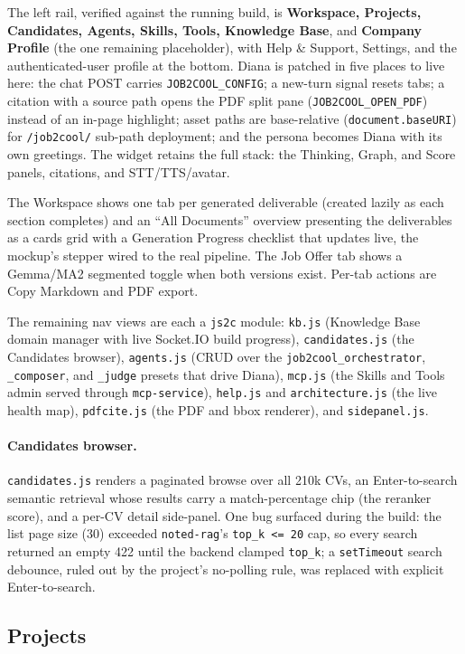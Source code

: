 The left rail, verified against the running build, is \textbf{Workspace, Projects,
Candidates, Agents, Skills, Tools, Knowledge Base}, and \textbf{Company Profile} (the one
remaining placeholder), with Help \& Support, Settings, and the authenticated-user profile
at the bottom. Diana is patched in five places to live here: the chat POST carries
\verb|JOB2COOL_CONFIG|; a new-turn signal resets tabs; a citation with a source path opens
the PDF split pane (\verb|JOB2COOL_OPEN_PDF|) instead of an in-page highlight; asset paths
are base-relative (\verb|document.baseURI|) for \verb|/job2cool/| sub-path deployment; and
the persona becomes Diana with its own greetings. The widget retains the full stack: the
Thinking, Graph, and Score panels, citations, and STT/TTS/avatar.

The Workspace shows one tab per generated deliverable (created lazily as each section
completes) and an ``All Documents'' overview presenting the deliverables as a cards grid
with a Generation Progress checklist that updates live, the mockup's stepper wired to the
real pipeline. The Job Offer tab shows a Gemma/MA2 segmented toggle when both versions
exist. Per-tab actions are Copy Markdown and PDF export.

The remaining nav views are each a \verb|js2c| module: \verb|kb.js| (Knowledge Base domain
manager with live Socket.IO build progress), \verb|candidates.js| (the Candidates browser),
\verb|agents.js| (CRUD over the \verb|job2cool_orchestrator|, \verb|_composer|, and
\verb|_judge| presets that drive Diana), \verb|mcp.js| (the Skills and Tools admin served
through \verb|mcp-service|), \verb|help.js| and \verb|architecture.js| (the live health
map), \verb|pdfcite.js| (the PDF and bbox renderer), and \verb|sidepanel.js|.

\paragraph{Candidates browser.} \verb|candidates.js| renders a paginated browse over all
210k CVs, an Enter-to-search semantic retrieval whose results carry a match-percentage chip
(the reranker score), and a per-CV detail side-panel. One bug surfaced during the build:
the list page size (30) exceeded \verb|noted-rag|'s \verb|top_k <= 20| cap, so every search
returned an empty 422 until the backend clamped \verb|top_k|; a \verb|setTimeout| search
debounce, ruled out by the project's no-polling rule, was replaced with explicit
Enter-to-search.

\subsection{Projects}
\label{sec:projects}

